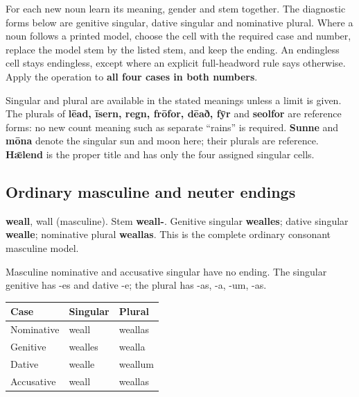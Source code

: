 For each new noun learn its meaning, gender and stem together. The diagnostic forms below are genitive singular, dative singular and nominative plural. Where a noun follows a printed model, choose the cell with the required case and number, replace the model stem by the listed stem, and keep the ending. An endingless cell stays endingless, except where an explicit full-headword rule says otherwise. Apply the operation to \textbf{all four cases in both numbers}.

Singular and plural are available in the stated meanings unless a limit is given. The plurals of \textbf{lēad, īsern, regn, frōfor, dēað, fȳr} and \textbf{seolfor} are reference forms: no new count meaning such as separate “rains” is required. \textbf{Sunne} and \textbf{mōna} denote the singular sun and moon here; their plurals are reference. \textbf{Hǣlend} is the proper title and has only the four assigned singular cells.

\subsection*{Ordinary masculine and neuter endings}

\textbf{weall}, wall (masculine). Stem \textbf{weall-}. Genitive singular \textbf{wealles}; dative singular \textbf{wealle}; nominative plural \textbf{weallas}. This is the complete ordinary consonant masculine model.

Masculine nominative and accusative singular have no ending. The singular genitive has -es and dative -e; the plural has -as, -a, -um, -as.

\par\begingroup
\fontsize{10.5}{13.2}\selectfont
\setlength{\LTleft}{0pt}\setlength{\LTright}{\fill}
\noindent
\begin{tabular}{@{}>{\raggedright\arraybackslash}p{39.46mm}>{\raggedright\arraybackslash}p{39.46mm}>{\raggedright\arraybackslash}p{39.46mm}@{}}
\toprule
\textbf{Case} & \textbf{Singular} & \textbf{Plural} \\
\midrule
Nominative & weall & weallas \\
Genitive & wealles & wealla \\
Dative & wealle & weallum \\
Accusative & weall & weallas \\
\bottomrule
\end{tabular}
\par\endgroup

